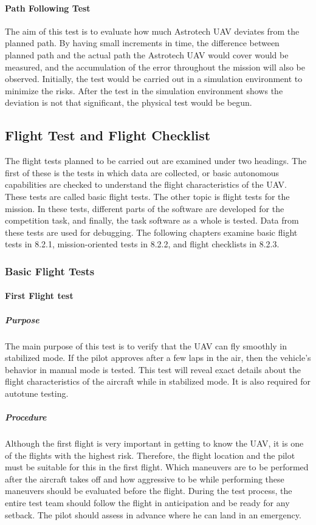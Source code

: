 \documentclass[12pt]{article}
\begin{document}
\paragraph*{Path Following Test} The aim of this test is to evaluate how much Astrotech UAV deviates from the planned path. By having small increments in time, the difference between planned path and the actual path the Astrotech UAV would cover would be measured, and the accumulation of the error throughout the mission will also be observed. Initially, the test would be carried out in a simulation environment to minimize the risks. After the test in the simulation environment shows the deviation is not that significant, the physical test would be begun.


\subsection{Flight Test and Flight Checklist}
The flight tests planned to be carried out are examined under two headings. The first of these is the tests in which data are collected, or basic autonomous capabilities are checked to understand the flight characteristics of the UAV. These tests are called basic flight tests. The other topic is flight tests for the mission. In these tests, different parts of the software are developed for the competition task, and finally, the task software as a whole is tested. Data from these tests are used for debugging. The following chapters examine basic flight tests in 8.2.1, mission-oriented tests in 8.2.2, and flight checklists in 8.2.3.

\subsubsection{Basic Flight Tests}

\paragraph*{First Flight test}

\subparagraph*{Purpose} The main purpose of this test is to verify that the UAV can fly smoothly in stabilized mode. If the pilot approves after a few laps in the air, then the vehicle's behavior in manual mode is tested. This test will reveal exact details about the flight characteristics of the aircraft while in stabilized mode. It is also required for autotune testing.

\subparagraph*{Procedure}
Although the first flight is very important in getting to know the UAV, it is one of the flights with the highest risk. Therefore, the flight location and the pilot must be suitable for this in the first flight. Which maneuvers are to be performed after the aircraft takes off and how aggressive to be while performing these maneuvers should be evaluated before the flight. During the test process, the entire test team should follow the flight in anticipation and be ready for any setback. The pilot should assess in advance where he can land in an emergency. 
\end{document}
